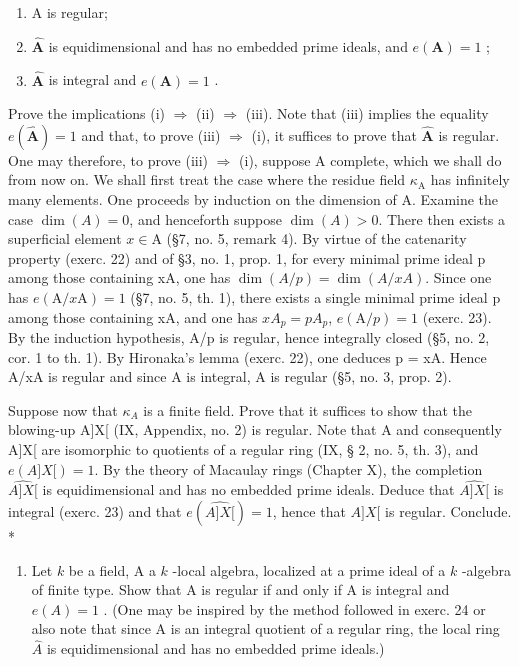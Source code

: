 \begin{enumerate}
\def\labelenumi{(\roman{enumi})}
\item
  A is regular;
\item
  \(\hat{\mathbf{A}}\) is equidimensional and has no embedded prime ideals, and \(e(\mathbf{A}) = 1\) ;
\item
  \(\hat{\mathbf{A}}\) is integral and \(e(\mathbf{A}) = 1\) .
\end{enumerate}

Prove the implications (i) \(\Rightarrow\) (ii) \(\Rightarrow\) (iii). Note that (iii) implies the equality \(e(\hat{\mathbf{A}}) = 1\) and that, to prove (iii) \(\Rightarrow\) (i), it suffices to prove that \(\hat{\mathbf{A}}\) is regular. One may therefore, to prove (iii) \(\Rightarrow\) (i), suppose A complete, which we shall do from now on. We shall first treat the case where the residue field \(\kappa_{\mathrm{A}}\) has infinitely many elements. One proceeds by induction on the dimension of A. Examine the case \(\dim(A) = 0\), and henceforth suppose \(\dim(A) > 0\). There then exists a superficial element \(x \in \mathrm{A}\) (\S 7, no. 5, remark 4). By virtue of the catenarity property (exerc. 22) and of \S 3, no. 1, prop. 1, for every minimal prime ideal p among those containing xA, one has \(\dim(A/p) = \dim(A/xA)\). Since one has \(e(\mathrm{A}/x\mathrm{A}) = 1\) (\S 7, no. 5, th. 1), there exists a single minimal prime ideal p among those containing xA, and one has \(xA_{p} = pA_{p}\), \(e(\mathrm{A}/p) = 1\) (exerc. 23). By the induction hypothesis, A/p is regular, hence integrally closed (\S 5, no. 2, cor. 1 to th. 1). By Hironaka's lemma (exerc. 22), one deduces p = xA. Hence A/xA is regular and since A is integral, A is regular (\S 5, no. 3, prop. 2).

Suppose now that \(\kappa_{A}\) is a finite field. Prove that it suffices to show that the blowing-up A{]}X{[} (IX, Appendix, no. 2) is regular. Note that A and consequently A{]}X{[} are isomorphic to quotients of a regular ring (IX, § 2, no. 5, th. 3), and \(e(A]X[)=1\). By the theory of Macaulay rings (Chapter X), the completion \(\widehat{A]X[}\) is equidimensional and has no embedded prime ideals. Deduce that \(\widehat{A]X[}\) is integral (exerc. 23) and that \(e(\widehat{A]X[})=1\), hence that \(A]X[\) is regular. Conclude. *

\begin{enumerate}
\def\labelenumi{\arabic{enumi})}
\setcounter{enumi}{24}
\tightlist
\item
  Let \(k\) be a field, A a \(k\) -local algebra, localized at a prime ideal of a \(k\) -algebra of finite type. Show that A is regular if and only if A is integral and \(e(A) = 1\) . (One may be inspired by the method followed in exerc. 24 or also note that since A is an integral quotient of a regular ring, the local ring \(\hat{A}\) is equidimensional and has no embedded prime ideals.)
\end{enumerate}

